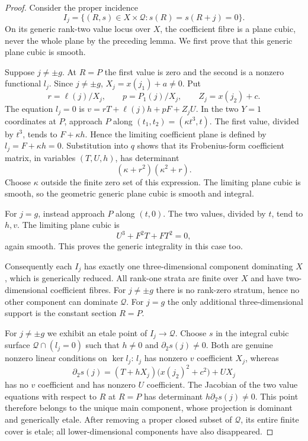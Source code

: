 \begin{proof}
Consider the proper incidence
\[
 I_j=\{(R,s)\in X\times\mathcal Q:s(R)=s(R+j)=0\}.
\]
On its generic rank-two value locus over $X$, the coefficient fibre
is a plane cubic, never the whole plane by the preceding lemma.
We first prove that this generic plane cubic is smooth.

Suppose $j\ne\pm g$. At $R=P$ the first value is zero and the
second is a nonzero functional $l_j$. Since $j\ne\pm g$,
$X_j=x(j_1)+a\ne0$. Put
\[
 r=\ell(j)/X_j,\qquad p=P_1(j)/X_j,\qquad Z_j=x(j_2)+c.
\]
The equation $l_j=0$ is
$v=rT+\ell(j)h+pF+Z_jU$.
In the two $Y=1$ coordinates at $P$, approach $P$ along
$(t_1,t_2)=(\kappa t^3,t)$. The first value, divided by $t^3$,
tends to $F+\kappa h$. Hence the limiting coefficient plane is
defined by $l_j=F+\kappa h=0$. Substitution into $q$ shows that
its Frobenius-form coefficient matrix, in variables $(T,U,h)$,
has determinant
\begin{equation}\label{eq:ss-pair-plane-determinant}
                        (\kappa+r^2)(\kappa^2+r).
\end{equation}
Choose $\kappa$ outside the finite zero set of this expression.
The limiting plane cubic is smooth, so the geometric generic
plane cubic is smooth and integral.

For $j=g$, instead approach $P$ along $(t,0)$. The two values,
divided by $t$, tend to $h,v$. The limiting plane cubic is
\[
                           U^3+F^2T+FT^2=0,
\]
again smooth. This proves the generic integrality in this case too.

Consequently each $I_j$ has exactly one three-dimensional component
dominating $X$, which is generically reduced. All rank-one strata
are finite over $X$ and have two-dimensional coefficient fibres.
For $j\ne\pm g$ there is no rank-zero stratum, hence no other
component can dominate $\mathcal Q$. For $j=g$ the only additional
three-dimensional support is the constant section $R=P$.

For $j\ne\pm g$ we exhibit an etale point of $I_j\to\mathcal Q$.
Choose $s$ in the integral cubic surface $\mathcal Q\cap(l_j=0)$
such that $h\ne0$ and $\partial_2s(j)\ne0$.
Both are genuine nonzero linear conditions on $\ker l_j$:
$l_j$ has nonzero $v$ coefficient $X_j$, whereas
\[
 \partial_2s(j)=(T+hX_j)\bigl(x(j_2)^2+c^2\bigr)+UX_j
\]
has no $v$ coefficient and has nonzero $U$ coefficient.
The Jacobian of the two value equations with respect to $R$ at
$R=P$ has determinant $h\partial_2s(j)\ne0$.
This point therefore belongs to the unique main component, whose
projection is dominant and generically etale. After removing a
proper closed subset of $\mathcal Q$, its entire finite cover is
etale; all lower-dimensional components have also disappeared.


\end{proof}
